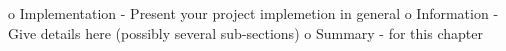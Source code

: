 o   Implementation - Present your project implemetion in general
o   Information - Give details here (possibly several sub-sections)
o   Summary - for this chapter

% 
